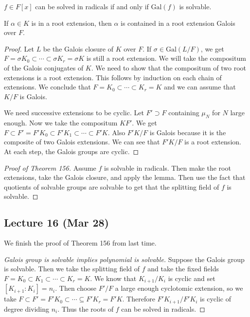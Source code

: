 \documentclass[10pt, twoside]{article}
\begin{document}
        \begin{thm} $f \in F[x]$ can be solved in radicals if and only if
        $\mathrm{Gal}(f)$ is solvable.  \end{thm}

        \begin{lem} If $\alpha \in K$ is in a root extension, then $\alpha$ is
            contained in a root extension Galois over $F$.  \begin{proof} Let
                $L$ be the Galois closure of $K$ over $F$. If $\sigma \in
                \mathrm{Gal}(L/F)$, we get $F = \sigma K_0 \subset \cdots
                \subset \sigma K_r = \sigma K$ is still a root extension. We
                will take the compositum of the Galois conjugates of $K$. We
                need to show that the compositum of two root extensions is a
                root extension. This follows by induction on each chain of
                extensions. We conclude that $F = K_0 \subset \cdots \subset
                K_r = K$ and we can assume that $K/F$ is Galois.

                We need successive extensions to be cyclic. Let $F' \supset F$
            containing $\mu_N$ for $N$ large enough. Now we take the compositum
        $KF'$. We get $F \subset F' = F'K_0 \subset F'K_1 \subset \cdots
    \subset F'K$. Also $F'K/F$ is Galois because it is the composite of two
Galois extensions. We can see that $F'K/F$ is a root extension. At each step,
the Galois groups are cyclic.  \end{proof} \end{lem}

        \begin{proof}[Proof of Theorem 156] Assume $f$ is solvable in radicals.
            Then make the root extensions, take the Galois closure, and apply
            the lemma. Then use the fact that quotients of solvable groups are
            solvable to get that the splitting field of $f$ is solvable.
        \end{proof}

        \subsection{Lecture 16 (Mar 28)} We finish the proof of Theorem 156
        from last time.

        \begin{proof}[Galois group is solvable implies polynomial is solvable]
            Suppose the Galois group is solvable. Then we take the splitting
            field of $f$ and take the fixed fields $F = K_0 \subset K_1 \subset
            \cdots \subset K_r = K$. We know that $K_{i+1}/K_i$ is cyclic and
            set $[K_{i+1}:K_i] = n_i$. Then choose $F'/F$ a large enough
            cyclotomic extension, so we take $F \subset F' = F'K_0 \subset
            \cdots \subseteq F'K_r = F'K$. Therefore $F'K_{i+1}/F'K_i$ is
            cyclic of degree dividing $n_i$. Thus the roots of $f$ can be
            solved in radicals.  \end{proof}
\end{document}
